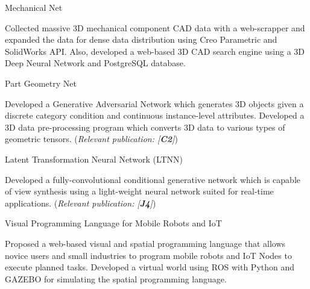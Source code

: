 


\begin{cventries}

\cvpub
{Mechanical Net} %
{ %
\begin{cvitems}
\item {Collected massive 3D mechanical component CAD data with a web-scrapper and expanded the data for dense data distribution using Creo Parametric and SolidWorks API. Also, developed a web-based 3D CAD search engine using a 3D Deep Neural Network and PostgreSQL database.}
\end{cvitems}
}

\cvpub
{Part Geometry Net} %
{ %
\begin{cvitems}
\item {Developed a Generative Adversarial Network which generates 3D objects given a discrete category condition and continuous instance-level attributes. Developed a 3D data pre-processing program which converts 3D data to various types of geometric tensors. (\textit{Relevant publication: [\textbf{C2}]})}
\end{cvitems}
}


\cvpub
{Latent Transformation Neural Network (LTNN)} %
{ %
\begin{cvitems}
\item {Developed a fully-convolutional conditional generative network which is capable of view synthesis using a light-weight neural network suited for real-time applications. (\textit{Relevant publication: [\textbf{J4}]})}
\end{cvitems}
}


\cvpub
{Visual Programming Language for Mobile Robots and IoT} %
{ %
\begin{cvitems}
\item {Proposed a web-based visual and spatial programming language that allows novice users and small industries to program mobile robots and IoT Nodes to execute planned tasks. Developed a virtual world using ROS with Python and GAZEBO for simulating the spatial programming language.}
\end{cvitems} 
}


\end{cventries}

